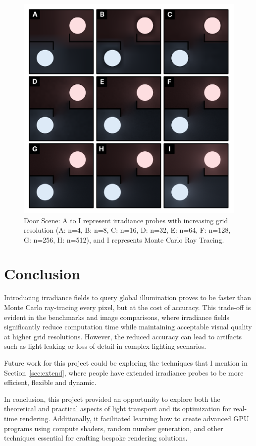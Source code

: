 \documentclass[acmtog, nonacm]{acmart}
\begin{document}
\begin{figure}[ht]
  \centering
  \includegraphics[width=0.9\linewidth]{door.pdf}
  \caption{Door Scene: A to I represent irradiance probes with increasing grid resolution (A: n=4, B: n=8, C: n=16, D: n=32, E: n=64, F: n=128, G: n=256, H: n=512), and I represents Monte Carlo Ray Tracing.}
\end{figure}

\break
\section{Conclusion}

Introducing irradiance fields to query global illumination proves to be faster than Monte Carlo ray-tracing every pixel, but at the cost of accuracy.  This trade-off is evident in the benchmarks and image comparisons, where irradiance fields significantly reduce computation time while maintaining acceptable visual quality at higher grid resolutions. However, the reduced accuracy can lead to artifacts such as light leaking or loss of detail in complex lighting scenarios. 

Future work for this project could be exploring the techniques that I mention in Section~\ref{sec:extend}, where people have extended irradiance probes to be more efficient, flexible and dynamic.

In conclusion, this project provided an opportunity to explore both the theoretical and practical aspects of light transport and its optimization for real-time rendering. Additionally, it facilitated learning how to create advanced GPU programs using compute shaders, random number generation, and other techniques essential for crafting bespoke rendering solutions.
\end{document}
